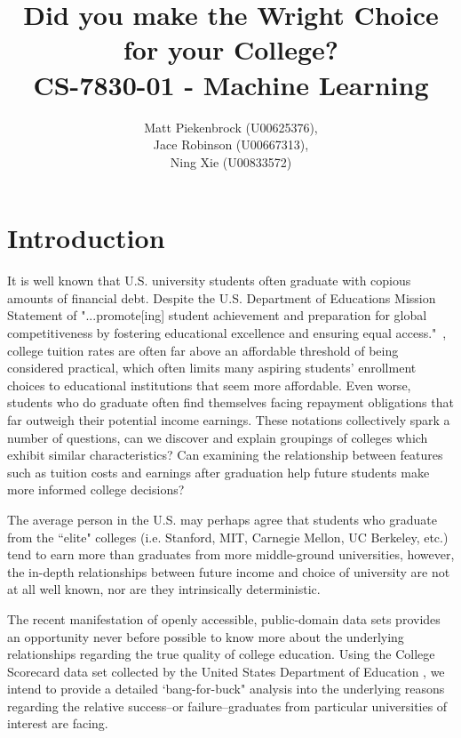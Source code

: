\documentclass[10pt]{article}
\author{Matt Piekenbrock (U00625376), \\ Jace Robinson (U00667313), \\Ning Xie (U00833572)}
\title{Did you make the Wright Choice for your College? \\
{\large CS-7830-01 - Machine Learning}}
\begin{document}
\maketitle %
\clearpage %
\tableofcontents %
\clearpage %
\section{Introduction}
    It is well known that U.S. university students often graduate with copious amounts of financial debt. Despite the U.S. Department of Educations Mission Statement of "...promote[ing] student achievement and preparation for global competitiveness by fostering educational excellence and ensuring equal access."~\cite{Overview75:online}, college tuition rates are often far above an affordable threshold of being considered practical, which often limits many aspiring students' enrollment choices to educational institutions that seem more affordable. Even worse, students who do graduate often find themselves facing repayment obligations that far outweigh their potential income earnings. These notations collectively spark a number of questions, can we discover and explain groupings of colleges which exhibit similar characteristics? Can examining the relationship between features such as tuition costs and earnings after graduation help future students make more informed college decisions? 
    
    
    The average person in the U.S. may perhaps agree that students who graduate from the ``elite" colleges (i.e. Stanford, MIT, Carnegie Mellon, UC Berkeley, etc.) tend to earn more than graduates from more middle-ground universities, however, the in-depth relationships between future income and choice of university are not at all well known, nor are they intrinsically deterministic. 

    The recent manifestation of openly accessible, public-domain data sets provides an opportunity never before possible to know more about the underlying relationships regarding the true quality of college education. Using the College Scorecard data set collected by the United States Department of Education \cite{collegeScorecard}, we intend to provide a detailed `bang-for-buck" analysis into the underlying reasons regarding the relative success--or failure--graduates from particular universities of interest are facing. 
   
\end{document}
